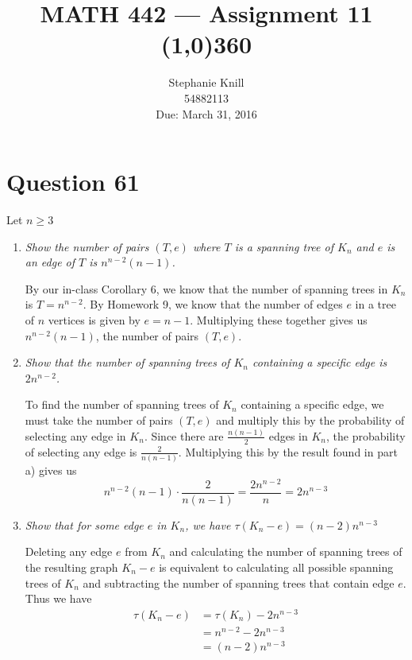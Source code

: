 \documentclass[11pt, oneside]{article}   	%
\begin{document}
\title{MATH 442 --- Assignment 11 \\
\line(1,0){360} \\              %
}
\author{
Stephanie Knill \\
54882113 \\
Due: March 31, 2016}

\date{}                   %
\maketitle




\section*{Question 61}

Let $n \geq 3$
\begin{enumerate}[\quad(a)]
	\item \emph{Show the number of pairs $(T,e)$ where $T$ is a spanning tree of $K_n$ and $e$ is an edge of $T$ is $n^{n-2}(n-1)$.}
	
	By our in-class Corollary 6, we know that the number of spanning trees in $K_n$ is $T=n^{n-2}$. By Homework 9, we know that the number of edges $e$ in a tree of $n$ vertices is given by $e=n-1$. Multiplying these together gives us $n^{n-2}(n-1)$, the number of pairs $(T,e)$.
	
	\item \emph{Show that the number of spanning trees of $K_n$ containing a specific edge is $2n^{n-2}$.}
	
	To find the number of spanning trees of $K_n$ containing a specific edge, we must take the number of pairs $(T,e)$ and multiply this by the probability of selecting any edge in $K_n$. Since there are $\frac{n(n-1)}{2}$ edges in  $K_n$, the probability of selecting any edge is $\frac{2}{n(n-1)}$. Multiplying this by the result found in part a) gives us
	$$n^{n-2}(n-1) \cdot \frac{2}{n(n-1)} = \frac{2 n^{n-2}}{n} = 2n^{n-3}$$
	
	\item \emph{Show that for some edge $e$ in $K_n$, we have $\tau(K_n-e) = (n-2)n^{n-3}$}
	
	Deleting any edge $e$ from $K_n$ and calculating the number of spanning trees of the resulting graph $K_n-e$  is equivalent to calculating all possible spanning trees of $K_n$ and subtracting the number of spanning trees that contain edge $e$. Thus we have
	\begin{align*}
		\tau(K_n - e) & = \tau(K_n) - 2n^{n-3} \\
		& = n^{n-2} - 2n^{n-3} \\
		& = (n-2)n^{n-3}
	\end{align*}
\end{enumerate}
\end{document}
